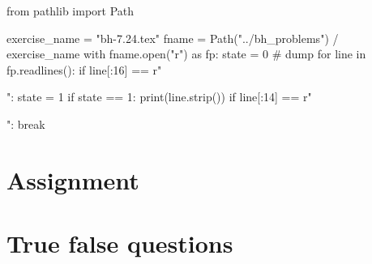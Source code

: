 \begin{pycode}
from pathlib import Path

exercise_name = "bh-7.24.tex"
fname = Path("../bh_problems") / exercise_name
with fname.open("r") as fp:
    state = 0  # dump
    for line in fp.readlines():
        if line[:16] == r"\begin{exercise}":
            state = 1
        if state == 1:
            print(line.strip())
        if line[:14] == r"\end{exercise}":
            break
\end{pycode}











\section{Assignment}
\label{sec:assignment}




\section{True false questions}
\label{sec:true-false-questions}
\setcounter{theorem}{0}





